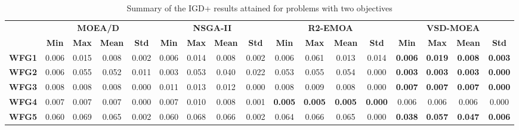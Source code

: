 \begin{table*}[t]
\caption{Summary of the IGD+ results attained for problems with two objectives}
\label{tab:StatisticsIGDP_2obj}
\centering
\begin{tabular}{cc|c|c|c|c|c|c|c|c|c|c|c|c|c|c|c}
\cline{2-17}
                                    & \multicolumn{4}{c|}{\textbf{MOEA/D}}                              & \multicolumn{4}{c|}{\textbf{NSGA-II}}                             & \multicolumn{4}{c|}{\textbf{R2-EMOA}}                             & \multicolumn{4}{c}{\textbf{VSD-MOEA}}                            \\ \cline{2-17} 
                                    & \textbf{Min}   & \textbf{Max}   & \textbf{Mean}  & \textbf{Std}   & \textbf{Min}   & \textbf{Max}   & \textbf{Mean}  & \textbf{Std}   & \textbf{Min}   & \textbf{Max}   & \textbf{Mean}  & \textbf{Std}   & \textbf{Min}   & \textbf{Max}   & \textbf{Mean}  & \textbf{Std}   \\ \hline
\multicolumn{1}{c|}{\textbf{WFG1}}  & 0.006          & 0.015          & 0.008          & 0.002          & 0.006          & 0.014          & 0.008          & 0.002          & 0.006          & 0.061          & 0.013          & 0.014          & \textbf{0.006} & \textbf{0.019} & \textbf{0.008} & \textbf{0.003} \\ \hline
\multicolumn{1}{c|}{\textbf{WFG2}}  & 0.006          & 0.055          & 0.052          & 0.011          & 0.003          & 0.053          & 0.040          & 0.022          & 0.053          & 0.055          & 0.054          & 0.000          & \textbf{0.003} & \textbf{0.003} & \textbf{0.003} & \textbf{0.000} \\ \hline
\multicolumn{1}{c|}{\textbf{WFG3}}  & 0.008          & 0.008          & 0.008          & 0.000          & 0.011          & 0.013          & 0.012          & 0.000          & 0.008          & 0.009          & 0.008          & 0.000          & \textbf{0.007} & \textbf{0.007} & \textbf{0.007} & \textbf{0.000} \\ \hline
\multicolumn{1}{c|}{\textbf{WFG4}}  & 0.007          & 0.007          & 0.007          & 0.000          & 0.007          & 0.010          & 0.008          & 0.001          & \textbf{0.005} & \textbf{0.005} & \textbf{0.005} & \textbf{0.000} & 0.006          & 0.006          & 0.006          & 0.000          \\ \hline
\multicolumn{1}{c|}{\textbf{WFG5}}  & 0.060          & 0.069          & 0.065          & 0.002          & 0.060          & 0.068          & 0.066          & 0.002          & 0.064          & 0.066          & 0.065          & 0.000          & \textbf{0.038} & \textbf{0.057} & \textbf{0.047} & \textbf{0.006} \\ \hline

\end{tabular}
\end{table*}
